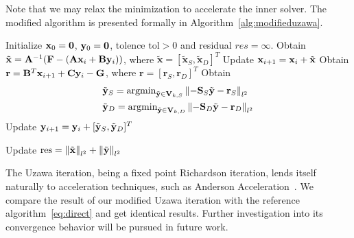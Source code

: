 Note that we may relax the minimization to accelerate the inner solver.
The modified algorithm is presented formally in Algorithm~\ref{alg:modifieduzawa}.
\begin{algorithm}
\caption{Modified Uzawa Iteration\label{alg:modifieduzawa}}
		  \begin{algorithmic}[1]
					 \State Initialize $\bold{x}_0 = \bold{0}$, $\bold{y}_0 = \bold{0}$, tolence $\text{tol} > 0$ and residual $res = \infty$.
					 \vspace{0.3cm}
					 \vspace{0.3cm}
					 \State Obtain $\tilde{\mathbf{x}} = \bold{A}^{-1} (\bold{F} - (\bold{A}\bold{x}_i + \bold{B}\bold{y}_i))$, where
					 $\tilde{\mathbf{x}} = 
					 [\tilde{\mathbf{x}}_S, \tilde{\mathbf{x}}_D]^T$
					 \vspace{0.3cm}
					 \State Update $\bold{x}_{i+1} = \bold{x}_i + \tilde{\mathbf{x}}$
					 \vspace{0.3cm}
					 \State Obtain $\bold{r} = \bold{B}^T\bold{x}_{i+1} + \bold{C}\bold{y}_{i} - \bold{G}$, where $\mathbf{r} = [\mathbf{r}_S,\mathbf{r}_D]^T$
                \vspace{0.3cm}
					 \State Obtain 
					 \begin{equation*}
					 \begin{aligned}
								&\tilde{\bold{y}}_S =\text{argmin}_{\tilde{\bold{y}}\in \mathbf{V}_{k,S}} \left\lVert-\bold{S}_S\tilde{\bold{y}}-\bold{r}_S\right\rVert_{l^2} \\
								&\tilde{\bold{y}}_D =\text{argmin}_{\tilde{\bold{y}}\in \mathbf{V}_{k,D}} \left\lVert-\bold{S}_D\tilde{\bold{y}}-\bold{r}_D\right\rVert_{l^2}
					 \end{aligned}
		  \end{equation*}
					 \vspace{0.3cm}
					 \State Update $\bold{y}_{i+1} = \bold{y}_i + 
					 [\tilde{\bold{y}}_S,\tilde{\bold{y}}_D]^T$
					 \vspace{0.3cm}

					 					 \State Update $\text{res} = \left\lVert\tilde{\mathbf{x}}\right\rVert_{l^2} + 
					 \left\lVert\tilde{\mathbf{y}}\right\rVert_{l^2}$
	\vspace{0.3cm}
					 \EndWhile
\end{algorithmic}
\end{algorithm}

The Uzawa iteration, being a fixed point Richardson iteration, lends itself naturally to
acceleration techniques, such as Anderson Acceleration~\cite{doi:10.1137/10078356X}.
We compare the result of our modified Uzawa iteration with the reference algorithm~\eqref{eq:direct} and get identical results.
Further investigation into its convergence behavior will be pursued in future work.
